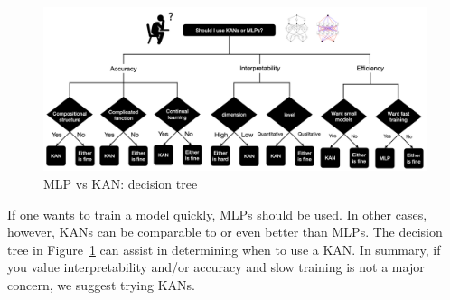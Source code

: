 \begin{figure}[H]
    \centering
    \includegraphics[width=0.75\linewidth]{LATEX//Images/MLP_KAN.png}
    \caption{MLP vs KAN: decision tree}
    \label{fig:dtree}
\end{figure}

If one wants to train a model quickly, MLPs should be used. In other cases, however, KANs can be comparable to or even better than MLPs. The decision tree in Figure~\ref{fig:dtree} can assist in determining when to use a KAN. In summary, if you value interpretability and/or accuracy and slow training is not a major concern, we suggest trying KANs.